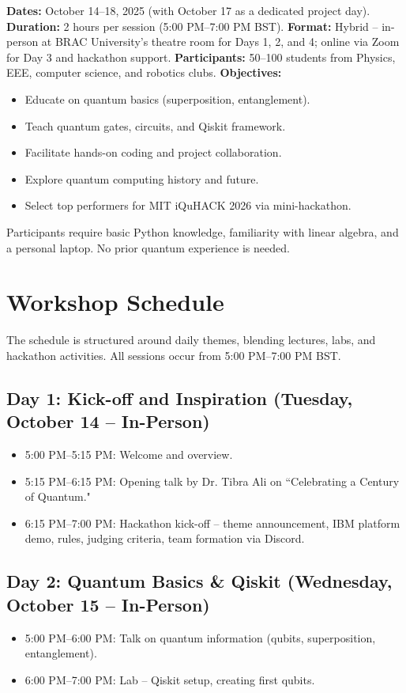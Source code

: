 \documentclass[11pt,a4paper]{article}
\begin{document}
\textbf{Dates:} October 14--18, 2025 (with October 17 as a dedicated project day).  
\textbf{Duration:} 2 hours per session (5:00 PM--7:00 PM BST).  
\textbf{Format:} Hybrid -- in-person at BRAC University's theatre room for Days 1, 2, and 4; online via Zoom for Day 3 and hackathon support.  
\textbf{Participants:} 50--100 students from Physics, EEE, computer science, and robotics clubs.  
\textbf{Objectives:} 
\begin{itemize}
    \item Educate on quantum basics (superposition, entanglement).
    \item Teach quantum gates, circuits, and Qiskit framework.
    \item Facilitate hands-on coding and project collaboration.
    \item Explore quantum computing history and future.
    \item Select top performers for MIT iQuHACK 2026 via mini-hackathon.
\end{itemize}

Participants require basic Python knowledge, familiarity with linear algebra, and a personal laptop. No prior quantum experience is needed.

\section{Workshop Schedule}

The schedule is structured around daily themes, blending lectures, labs, and hackathon activities. All sessions occur from 5:00 PM--7:00 PM BST.

\subsection{Day 1: Kick-off and Inspiration (Tuesday, October 14 -- In-Person)}
\begin{itemize}
    \item 5:00 PM--5:15 PM: Welcome and overview.
    \item 5:15 PM--6:15 PM: Opening talk by Dr. Tibra Ali on ``Celebrating a Century of Quantum."
    \item 6:15 PM--7:00 PM: Hackathon kick-off -- theme announcement, IBM platform demo, rules, judging criteria, team formation via Discord.
\end{itemize}

\subsection{Day 2: Quantum Basics \& Qiskit (Wednesday, October 15 -- In-Person)}
\begin{itemize}
    \item 5:00 PM--6:00 PM: Talk on quantum information (qubits, superposition, entanglement).
    \item 6:00 PM--7:00 PM: Lab -- Qiskit setup, creating first qubits.
\end{itemize}
\end{document}
